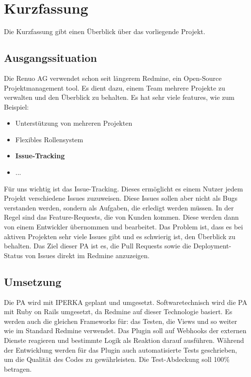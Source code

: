 \chapter{Kurzfassung}

Die Kurzfassung gibt einen Überblick über das vorliegende Projekt.

\section{Ausgangssituation}

Die Renuo AG verwendet schon seit längerem Redmine, ein Open-Source Projektmanagement tool. Es dient dazu, einem
Team mehrere Projekte zu verwalten und den Überblick zu behalten. Es hat sehr viele features, wie zum Beispiel: \cite{redmine_homepage}
\begin{itemize}
    \item Unterstützung von mehreren Projekten
    \item Flexibles Rollensystem
    \item \textbf{Issue-Tracking}
    \item ...
\end{itemize}
Für uns wichtig ist das Issue-Tracking. Dieses ermöglicht es einem Nutzer jedem Projekt verschiedene Issues zuzuweisen.
Diese Issues sollen aber nicht als Bugs verstanden werden, sondern als Aufgaben, die erledigt werden müssen. In der Regel sind das
Feature-Requests, die von Kunden kommen. Diese werden dann von einem Entwickler übernommen und bearbeitet. \newline
Das Problem ist, dass es bei aktiven Projekten sehr viele Issues gibt und es schwierig ist, den Überblick zu behalten.
Das Ziel dieser PA ist es, die Pull Requests sowie die Deployment-Status von Issues direkt im Redmine anzuzeigen.

\section{Umsetzung}

Die PA wird mit IPERKA geplant und umgesetzt. \newline
Softwaretechnisch wird die PA mit Ruby on Rails umgesetzt, da Redmine auf dieser Technologie basiert. Es werden auch
die gleichen Frameworks für: das Testen, die Views und so weiter wie im Standard Redmine verwendet. \newline
Das Plugin soll auf Webhooks der externen Dienste reagieren und bestimmte Logik als Reaktion darauf ausführen. \newline
Während der Entwicklung werden für das Plugin auch automatisierte Tests geschrieben, um die Qualität des Codes zu gewährleisten.
Die Test-Abdeckung soll 100\% betragen.

